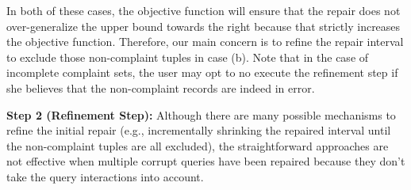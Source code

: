 
\indent In both of these cases, the objective function will ensure that the repair
does not over-generalize the upper bound towards the right because that strictly increases the objective function.
Therefore, our main concern is to refine the repair interval to exclude those non-complaint tuples in case (b).
Note that in the case of incomplete complaint sets, the user may opt to no execute the refinement step if she believes
that the non-complaint records are indeed in error.

\smallskip

\noindent\textbf{Step 2 (Refinement Step):} 
Although there are many possible mechanisms to refine the initial repair (e.g., incrementally shrinking
the repaired interval until the non-complaint tuples are all excluded), 
the straightforward approaches are not effective when multiple corrupt 
queries have been repaired because they don't take the query interactions into account.

